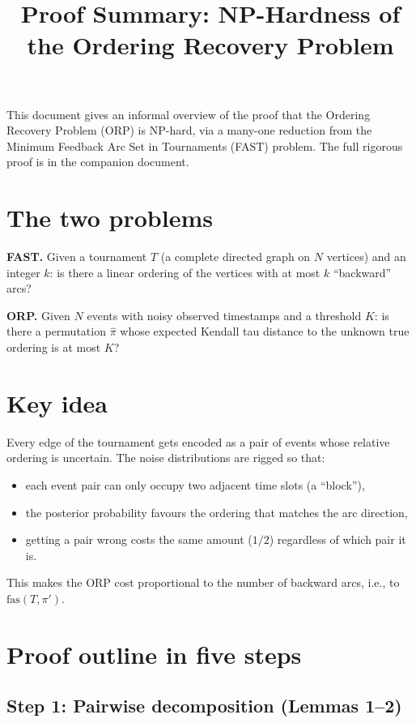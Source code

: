 \documentclass[11pt]{article}
\title{Proof Summary: NP-Hardness of the Ordering Recovery Problem}
\date{}
\begin{document}
\maketitle

\noindent This document gives an informal overview of the proof that the Ordering Recovery Problem (ORP) is NP-hard, via a many-one reduction from the Minimum Feedback Arc Set in Tournaments (FAST) problem. The full rigorous proof is in the companion document.

\section*{The two problems}

\textbf{FAST.} Given a tournament $T$ (a complete directed graph on $N$ vertices) and an integer $k$: is there a linear ordering of the vertices with at most $k$ ``backward'' arcs?

\textbf{ORP.} Given $N$ events with noisy observed timestamps and a threshold $K$: is there a permutation $\hat{\pi}$ whose expected Kendall tau distance to the unknown true ordering is at most $K$?

\section*{Key idea}

Every edge of the tournament gets encoded as a pair of events whose relative ordering is uncertain. The noise distributions are rigged so that:
\begin{itemize}
\item each event pair can only occupy two adjacent time slots (a ``block''),
\item the posterior probability favours the ordering that matches the arc direction,
\item getting a pair wrong costs the same amount ($1/2$) regardless of which pair it is.
\end{itemize}
This makes the ORP cost proportional to the number of backward arcs, i.e., to $\mathrm{fas}(T, \pi')$.

\section*{Proof outline in five steps}

\subsection*{Step 1: Pairwise decomposition (Lemmas 1--2)}
\end{document}
